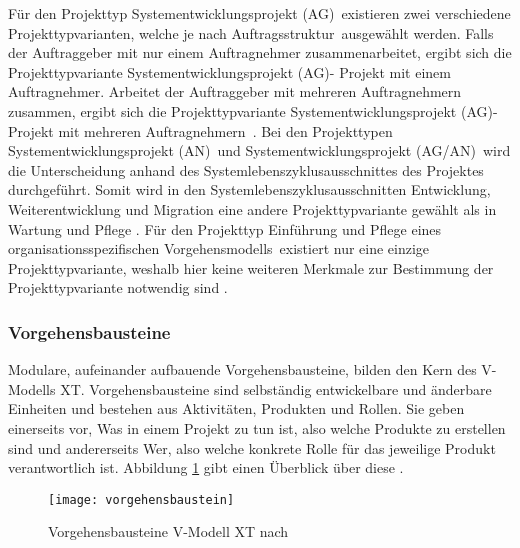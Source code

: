 Für den Projekttyp \grqq Systementwicklungsprojekt (AG)\grqq \ existieren zwei verschiedene Projekttypvarianten, welche je nach \grqq Auftragsstruktur\grqq \ ausgewählt werden. Falls der Auftraggeber mit nur einem Auftragnehmer zusammenarbeitet, ergibt sich die Projekttypvariante \grqq Systementwicklungsprojekt (AG)- Projekt mit einem Auftragnehmer\grqq. Arbeitet der Auftraggeber mit mehreren Auftragnehmern zusammen, ergibt sich die Projekttypvariante \grqq Systementwicklungsprojekt (AG)- Projekt mit mehreren Auftragnehmern\grqq \ \cite{2004vmodell}.\newline
Bei den Projekttypen \grqq Systementwicklungsprojekt (AN)\grqq \ und \grqq Systementwicklungsprojekt (AG/AN)\grqq \ wird die Unterscheidung anhand des Systemlebenszyklusausschnittes des Projektes durchgeführt. Somit wird in den Systemlebenszyklusausschnitten Entwicklung, Weiterentwicklung und Migration eine andere Projekttypvariante gewählt als in Wartung und Pflege \cite{2004vmodell}.\newline 
Für den Projekttyp \grqq Einführung und Pflege eines organisationsspezifischen Vorgehensmodells\grqq \ existiert nur eine einzige Projekttypvariante, weshalb hier keine weiteren Merkmale zur Bestimmung der Projekttypvariante notwendig sind \cite{2004vmodell}.\newline

  
 \subsubsection{Vorgehensbausteine}
Modulare, aufeinander aufbauende Vorgehensbausteine, bilden den Kern des V-Modells XT. Vorgehensbausteine sind selbständig entwickelbare und änderbare Einheiten und bestehen aus Aktivitäten, Produkten und Rollen. Sie geben einerseits vor, \grqq Was\grqq{}  in einem Projekt zu tun ist, also welche Produkte zu erstellen sind und andererseits \grqq Wer\grqq, also welche konkrete Rolle für das jeweilige Produkt verantwortlich ist. Abbildung \ref{fig:vorgehensbausteine} gibt einen Überblick über diese \cite{ruf2008, 2004vmodell}.\newline

\begin{figure}[htp]
\begin{center}
  \texttt{[image: vorgehensbaustein]} %
  \caption{Vorgehensbausteine V-Modell XT nach \cite{2004vmodell}}
  \label{fig:vorgehensbausteine}
\end{center}
\end{figure}

